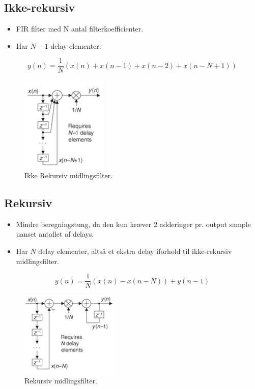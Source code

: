 \documentclass[danish]{article}
\begin{document}
\subsection{Ikke-rekursiv}
\begin{itemize}
	\item FIR filter med N antal filterkoefficienter. 
	\item Har $N-1$ delay elementer.
\end{itemize}

\begin{equation}
y(n)=\frac{1}{N}(x(n)+x(n-1)+x(n-2)+x(n-N+1))
\end{equation}

\begin{figure} [H]
	\centering
	\includegraphics[width=0.25\linewidth]{graphics/nonrecursic}
	\caption{Ikke Rekursiv midlingsfilter.}
	\label{fig:nonrecursic}
\end{figure}

\subsection{Rekursiv}
\begin{itemize}
	\item Mindre beregningstung, da den kun kræver 2 adderinger pr. output sample uanset antallet af delays.
	\item Har $N$ delay elementer, altså et ekstra delay iforhold til ikke-rekursiv midlingsfilter. 
\end{itemize}

\begin{equation}
y(n)=\frac{1}{N}(x(n)-x(n-N))+y(n-1)
\end{equation}

\begin{figure} [H]
	\centering
	\includegraphics[width=0.3\linewidth]{graphics/recursic}
	\caption{Rekursiv midlingsfilter.}
	\label{fig:recursic}
\end{figure}
\end{document}
